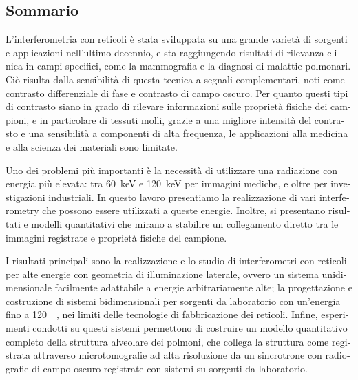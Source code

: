 \begin{otherlanguage}{italian}
\chapter*{Sommario}
L'interferometria con reticoli \`e stata sviluppata su una grande variet\`a
di sorgenti e applicazioni nell'ultimo decennio, e sta raggiungendo
risultati di rilevanza clinica in campi specifici, come la mammografia e la
diagnosi di malattie polmonari. Ci\`o risulta dalla sensibilit\`a di questa
tecnica a segnali complementari, noti come contrasto differenziale di fase e
contrasto di campo oscuro. Per quanto questi tipi di contrasto siano in
grado di rilevare informazioni sulle propriet\`a fisiche dei campioni, e in
particolare di tessuti molli, grazie a una migliore intensit\`a del
contrasto e una sensibilit\`a a componenti di alta frequenza, le
applicazioni alla medicina e alla scienza dei materiali sono limitate.

Uno dei problemi pi\`u importanti \`e la necessit\`a di utilizzare una
radiazione con energia pi\`u elevata: tra \SI{60}{\kilo\eV} e
\SI{120}{\kilo\eV} per immagini mediche, e oltre per investigazioni
industriali. In questo lavoro presentiamo la realizzazione di vari
interferometry che possono essere utilizzati a queste energie. Inoltre,
si presentano risultati e modelli quantitativi che mirano a stabilire un
collegamento diretto tra le immagini registrate e propriet\`a fisiche del
campione.

I risultati principali sono la realizzazione e lo studio di interferometri
con reticoli per alte energie con geometria di illuminazione laterale,
ovvero un sistema unidimensionale facilmente adattabile a energie
arbitrariamente alte; la progettazione e costruzione di sistemi
bidimensionali per sorgenti da laboratorio con un'energia fino a
\SI{120}{\kilo\voltpeak}, nei limiti delle tecnologie di fabbricazione dei
reticoli. Infine, esperimenti condotti su questi sistemi permettono di
costruire un modello quantitativo completo della struttura alveolare dei
polmoni, che collega la struttura come registrata attraverso microtomografie
ad alta risoluzione da un sincrotrone con radiografie di campo oscuro
registrate con sistemi su sorgenti da laboratorio.
\end{otherlanguage}

\endgroup

\vfill
